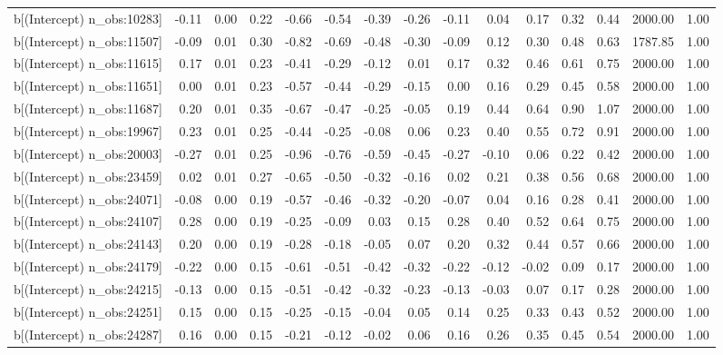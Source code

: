 \begin{table}[ht]
\begin{tabular}{rrrrrrrrrrrrrrr}
  b[(Intercept) n\_obs:10283] & -0.11 & 0.00 & 0.22 & -0.66 & -0.54 & -0.39 & -0.26 & -0.11 & 0.04 & 0.17 & 0.32 & 0.44 & 2000.00 & 1.00 \\ 
  b[(Intercept) n\_obs:11507] & -0.09 & 0.01 & 0.30 & -0.82 & -0.69 & -0.48 & -0.30 & -0.09 & 0.12 & 0.30 & 0.48 & 0.63 & 1787.85 & 1.00 \\ 
  b[(Intercept) n\_obs:11615] & 0.17 & 0.01 & 0.23 & -0.41 & -0.29 & -0.12 & 0.01 & 0.17 & 0.32 & 0.46 & 0.61 & 0.75 & 2000.00 & 1.00 \\ 
  b[(Intercept) n\_obs:11651] & 0.00 & 0.01 & 0.23 & -0.57 & -0.44 & -0.29 & -0.15 & 0.00 & 0.16 & 0.29 & 0.45 & 0.58 & 2000.00 & 1.00 \\ 
  b[(Intercept) n\_obs:11687] & 0.20 & 0.01 & 0.35 & -0.67 & -0.47 & -0.25 & -0.05 & 0.19 & 0.44 & 0.64 & 0.90 & 1.07 & 2000.00 & 1.00 \\ 
  b[(Intercept) n\_obs:19967] & 0.23 & 0.01 & 0.25 & -0.44 & -0.25 & -0.08 & 0.06 & 0.23 & 0.40 & 0.55 & 0.72 & 0.91 & 2000.00 & 1.00 \\ 
  b[(Intercept) n\_obs:20003] & -0.27 & 0.01 & 0.25 & -0.96 & -0.76 & -0.59 & -0.45 & -0.27 & -0.10 & 0.06 & 0.22 & 0.42 & 2000.00 & 1.00 \\ 
  b[(Intercept) n\_obs:23459] & 0.02 & 0.01 & 0.27 & -0.65 & -0.50 & -0.32 & -0.16 & 0.02 & 0.21 & 0.38 & 0.56 & 0.68 & 2000.00 & 1.00 \\ 
  b[(Intercept) n\_obs:24071] & -0.08 & 0.00 & 0.19 & -0.57 & -0.46 & -0.32 & -0.20 & -0.07 & 0.04 & 0.16 & 0.28 & 0.41 & 2000.00 & 1.00 \\ 
  b[(Intercept) n\_obs:24107] & 0.28 & 0.00 & 0.19 & -0.25 & -0.09 & 0.03 & 0.15 & 0.28 & 0.40 & 0.52 & 0.64 & 0.75 & 2000.00 & 1.00 \\ 
  b[(Intercept) n\_obs:24143] & 0.20 & 0.00 & 0.19 & -0.28 & -0.18 & -0.05 & 0.07 & 0.20 & 0.32 & 0.44 & 0.57 & 0.66 & 2000.00 & 1.00 \\ 
  b[(Intercept) n\_obs:24179] & -0.22 & 0.00 & 0.15 & -0.61 & -0.51 & -0.42 & -0.32 & -0.22 & -0.12 & -0.02 & 0.09 & 0.17 & 2000.00 & 1.00 \\ 
  b[(Intercept) n\_obs:24215] & -0.13 & 0.00 & 0.15 & -0.51 & -0.42 & -0.32 & -0.23 & -0.13 & -0.03 & 0.07 & 0.17 & 0.28 & 2000.00 & 1.00 \\ 
  b[(Intercept) n\_obs:24251] & 0.15 & 0.00 & 0.15 & -0.25 & -0.15 & -0.04 & 0.05 & 0.14 & 0.25 & 0.33 & 0.43 & 0.52 & 2000.00 & 1.00 \\ 
  b[(Intercept) n\_obs:24287] & 0.16 & 0.00 & 0.15 & -0.21 & -0.12 & -0.02 & 0.06 & 0.16 & 0.26 & 0.35 & 0.45 & 0.54 & 2000.00 & 1.00 \\ 

\end{tabular}
\end{table}
